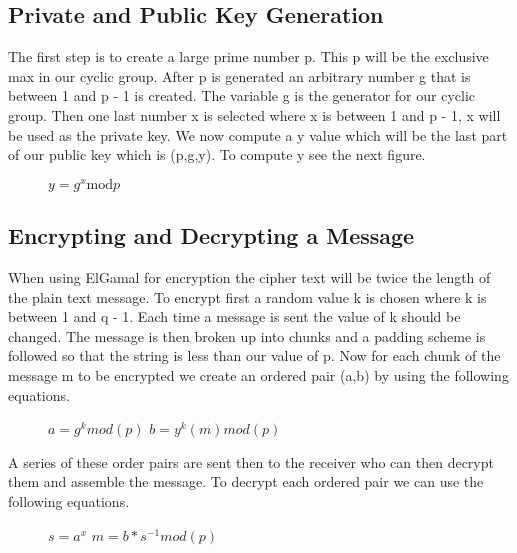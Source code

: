 \documentclass[conference]{IEEEtran}
\begin{document}
\subsection{Private and Public Key Generation}
The first step is to create a large prime number p. This p will be the exclusive max in our cyclic group. After p is generated an arbitrary number g that is between 1 and p - 1 is created. The variable g is the generator for our cyclic group. Then one last number x is selected where x is between 1 and p - 1, x will be used as the private key. We now compute a y value which will be the last part of our public key which is (p,g,y). To compute y see the next figure.

\begin{figure}[h]
	\begin{center}
		$y={g}^{x}\mathrm{mod}p$
	\end{center}	
\end{figure}


\subsection{Encrypting and Decrypting a Message}

When using ElGamal for encryption the cipher text will be twice the length of the plain text message. 
To encrypt first a random value k is chosen where k is between 1 and q - 1. Each time a message is sent the value of k should be changed. The message is then broken up into chunks and a padding scheme is followed so that the string is less than our value of p. Now for each chunk of the message m to be encrypted we create an ordered pair (a,b) by using the following equations.

\begin{figure}[h]
	\begin{center}
		$a={g}^{k}mod\left(p\right)$ \newline
		$b={y}^{k}\left(m\right)mod\left(p\right)$ \newline
	\end{center}
\end{figure}

A series of these order pairs are sent then to the receiver who can then decrypt them and assemble the message. To decrypt each ordered pair we can use the following equations.

\begin{figure}[H]
	\begin{center}
		$s={a}^{x}$ \newline
		$m=b * {s}^{-1} mod\left(p\right)$ \newline
	\end{center}
\end{figure}
\end{document}
